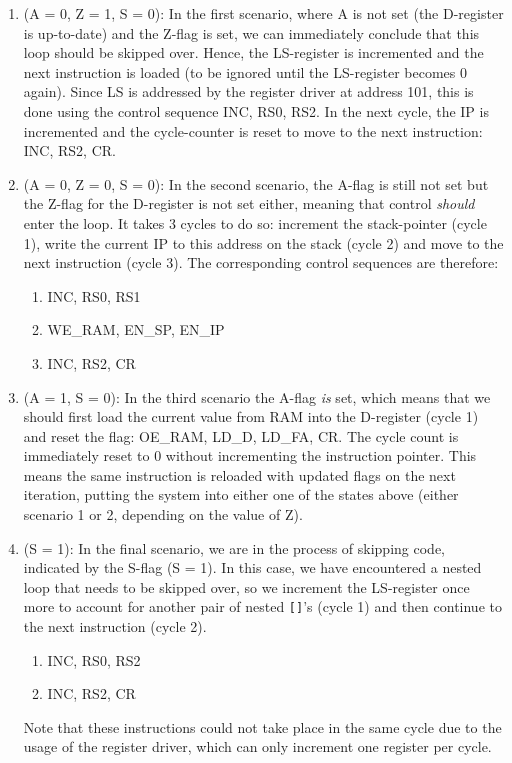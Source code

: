 \documentclass{article}
\begin{document}
  \begin{enumerate}
  \item (A = 0, Z = 1, S = 0): In the first scenario, where A is not set (the D-register is up-to-date) and the Z-flag is set, we can immediately conclude that this loop should be skipped over. Hence, the LS-register is incremented and the next instruction is loaded (to be ignored until the LS-register becomes 0 again). Since LS is addressed by the register driver at address 101, this is done using the control sequence INC, RS0, RS2. In the next cycle, the IP is incremented and the cycle-counter is reset to move to the next instruction: INC, RS2, CR.

  \item (A = 0, Z = 0, S = 0): In the second scenario, the A-flag is still not set but the Z-flag for the D-register is not set either, meaning that control \emph{should} enter the loop. It takes 3 cycles to do so: increment the stack-pointer (cycle 1), write the current IP to this address on the stack (cycle 2) and move to the next instruction (cycle 3). The corresponding control sequences are therefore:
    \begin{enumerate}
    \item INC, RS0, RS1
    \item WE\_RAM, EN\_SP, EN\_IP
    \item INC, RS2, CR
    \end{enumerate}

  \item (A = 1, S = 0): In the third scenario the A-flag \emph{is} set, which means that we should first load the current value from RAM into the D-register (cycle 1) and reset the flag: OE\_RAM, LD\_D, LD\_FA, CR. The cycle count is immediately reset to 0 without incrementing the instruction pointer. This means the same instruction is reloaded with updated flags on the next iteration, putting the system into either one of the states above (either scenario 1 or 2, depending on the value of Z).

  \item (S = 1): In the final scenario, we are in the process of skipping code, indicated by the S-flag (S = 1). In this case, we have encountered a nested loop that needs to be skipped over, so we increment the LS-register once more to account for another pair of nested \texttt{[]}'s (cycle 1) and then continue to the next instruction (cycle 2).
    \begin{enumerate}
    \item INC, RS0, RS2
    \item INC, RS2, CR
    \end{enumerate}
    Note that these instructions could not take place in the same cycle due to the usage of the register driver, which can only increment one register per cycle.
  \end{enumerate}
\end{document}
